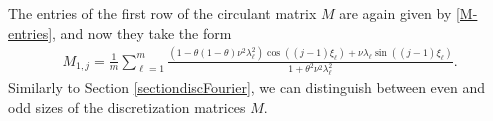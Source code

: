 \documentclass[a4paper]{article}
\begin{document}
The entries of the first row of the circulant matrix $M$ are again given by \eqref{M-entries}, and now %
they take the form
\begin{align}\label{eq51}
	M_{1,j}  = \frac{1}{m} \sum_{\ell=1}^{m} \frac{\left(1-\theta(1-\theta)\nu^2\lambda_\ell^2\right)
  \cos((j-1)\xi_\ell) + \nu\lambda_\ell\sin((j-1)\xi_\ell)}{1+\theta^2\nu^2\lambda_\ell^2}.
\end{align}
Similarly to Section \ref{sectiondiscFourier}, we can distinguish between even and odd sizes of the discretization
matrices $M$.\\
\end{document}
